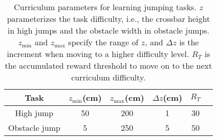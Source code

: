 \begin{table}[t]
\centering
\caption{Curriculum parameters for learning jumping tasks. $z$ parameterizes the task difficulty, i.e., the crossbar height in high jumps and the obstacle width in obstacle jumps. $z_\text{min}$ and $z_\text{max}$ specify the range of $z$, and $\Delta z$ is the increment when moving to a higher difficulty level. $R_T$ is the accumulated reward threshold to move on to the next curriculum difficulty.}
\begin{tabular}{|c|c|c|c|c|c|} 
\hline
Task & $z_\text{min}$(cm) & $z_\text{max}$(cm) & $\Delta z$(cm) & $R_T$ \\ 
\hline
High jump     & 50   & 200 & 1 & 30     \\
\hline
Obstacle jump & 5  & 250 & 5 & 50   \\
\hline
\end{tabular}
\label{tb:curriculum}
\end{table}
